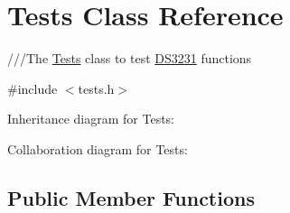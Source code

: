 \hypertarget{classTests}{}\section{Tests Class Reference}
\label{classTests}


///\+The \hyperlink{classTests}{Tests} class to test \hyperlink{classDS3231}{D\+S3231} functions  




{\ttfamily \#include $<$tests.\+h$>$}



Inheritance diagram for Tests\+:


Collaboration diagram for Tests\+:
\subsection*{Public Member Functions}
